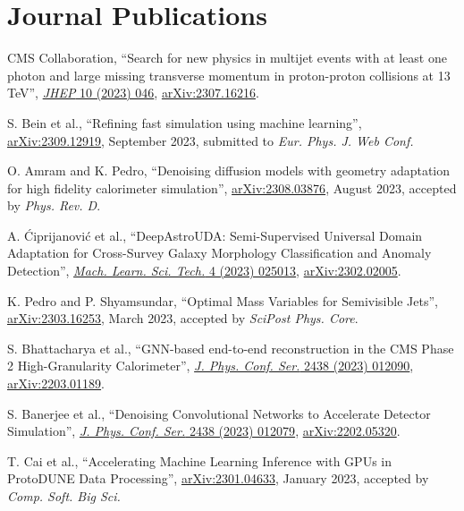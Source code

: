 \section{Journal Publications}
\begin{description}[leftmargin=12pt,font=\normalfont,labelsep=0em]
\item CMS Collaboration, ``Search for new physics in multijet events with at least one photon and large missing transverse momentum in proton-proton collisions at 13 TeV'', \href{https://doi.org/10.1007/JHEP10(2023)046}{\emph{JHEP} 10 (2023) 046}, \href{https://arxiv.org/abs/2307.16216}{arXiv:2307.16216}.
\item S. Bein et al., ``Refining fast simulation using machine learning'', \href{https://arxiv.org/abs/2309.12919}{arXiv:2309.12919}, September 2023, submitted to \emph{Eur. Phys. J. Web Conf.}
\item O. Amram and K. Pedro, ``Denoising diffusion models with geometry adaptation for high fidelity calorimeter simulation'', \href{https://arxiv.org/abs/2308.03876}{arXiv:2308.03876}, August 2023, accepted by \emph{Phys. Rev. D}.
\item A. \'Ciprijanovi\'c et al., ``DeepAstroUDA: Semi-Supervised Universal Domain Adaptation for Cross-Survey Galaxy Morphology Classification and Anomaly Detection'', \href{https://doi.org/10.1088/2632-2153/acca5f}{\emph{Mach. Learn. Sci. Tech.} 4 (2023) 025013}, \href{https://arxiv.org/abs/2302.02005}{arXiv:2302.02005}.
\item K. Pedro and P. Shyamsundar, ``Optimal Mass Variables for Semivisible Jets'', \href{https://arxiv.org/abs/2303.16253}{arXiv:2303.16253}, March 2023, accepted by \emph{SciPost Phys. Core}.
\item S. Bhattacharya et al., ``GNN-based end-to-end reconstruction in the CMS Phase 2 High-Granularity Calorimeter'', \href{https://doi.org/10.1088/1742-6596/2438/1/012090}{\emph{J. Phys. Conf. Ser.} 2438 (2023) 012090}, \href{https://arxiv.org/abs/2203.01189}{arXiv:2203.01189}.
\item S. Banerjee et al., ``Denoising Convolutional Networks to Accelerate Detector Simulation'', \href{https://doi.org/10.1088/1742-6596/2438/1/012079}{\emph{J. Phys. Conf. Ser.} 2438 (2023) 012079}, \href{https://arxiv.org/abs/2202.05320}{arXiv:2202.05320}.
\item T. Cai et al., ``Accelerating Machine Learning Inference with GPUs in ProtoDUNE Data Processing'', \href{https://arxiv.org/abs/2301.04633}{arXiv:2301.04633}, January 2023, accepted by \emph{Comp. Soft. Big Sci.}

\end{description}
